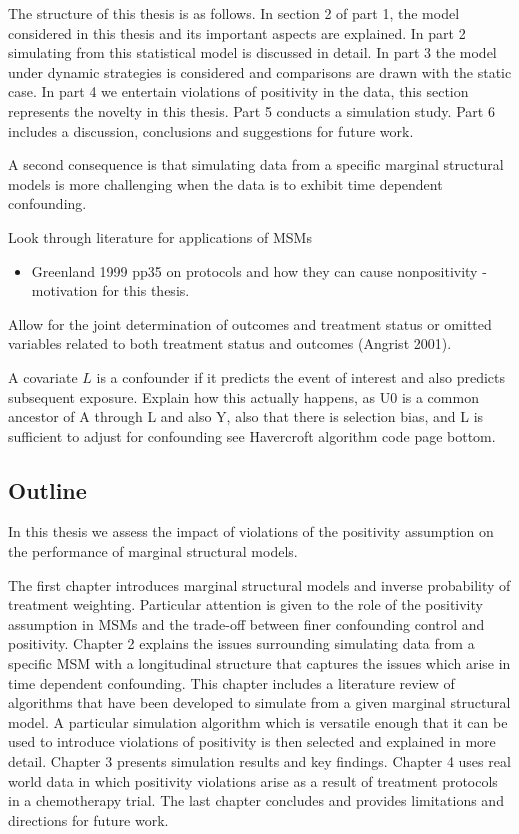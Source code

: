 \documentclass[11pt]{article}
\providecommand{\tightlist}{%
      \setlength{\itemsep}{0pt}\setlength{\parskip}{0pt}}
\begin{document}
The structure of this thesis is as follows. In section 2 of part 1, the
model considered in this thesis and its important aspects are explained.
In part 2 simulating from this statistical model is discussed in detail.
In part 3 the model under dynamic strategies is considered and
comparisons are drawn with the static case. In part 4 we entertain
violations of positivity in the data, this section represents the
novelty in this thesis. Part 5 conducts a simulation study. Part 6
includes a discussion, conclusions and suggestions for future work.
\linebreak

A second consequence is that simulating data from a specific marginal
structural models is more challenging when the data is to exhibit time
dependent confounding.

Look through literature for applications of MSMs

\begin{itemize}
\tightlist
\item
  Greenland 1999 pp35 on protocols and how they can cause nonpositivity
  - motivation for this thesis.
\end{itemize}

    Allow for the joint determination of outcomes and treatment status or
omitted variables related to both treatment status and outcomes (Angrist
2001).

A covariate \(L\) is a confounder if it predicts the event of interest
and also predicts subsequent exposure. Explain how this actually
happens, as U0 is a common ancestor of A through L and also Y, also that
there is selection bias, and L is sufficient to adjust for confounding
see Havercroft algorithm code page bottom.

    \subsection{Outline}\label{outline}

In this thesis we assess the impact of violations of the positivity
assumption on the performance of marginal structural models. \linebreak

The first chapter introduces marginal structural models and inverse
probability of treatment weighting. Particular attention is given to the
role of the positivity assumption in MSMs and the trade-off between
finer confounding control and positivity. Chapter 2 explains the issues
surrounding simulating data from a specific MSM with a longitudinal
structure that captures the issues which arise in time dependent
confounding. This chapter includes a literature review of algorithms
that have been developed to simulate from a given marginal structural
model. A particular simulation algorithm which is versatile enough that
it can be used to introduce violations of positivity is then selected
and explained in more detail. Chapter 3 presents simulation results and
key findings. Chapter 4 uses real world data in which positivity
violations arise as a result of treatment protocols in a chemotherapy
trial. The last chapter concludes and provides limitations and
directions for future work.
\end{document}
